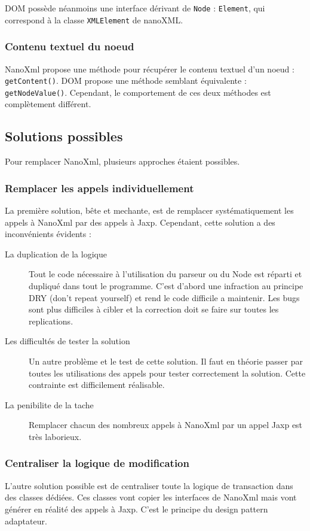 DOM possède néanmoins une interface dérivant de \verb|Node| : \verb|Element|, qui correspond à la classe \verb|XMLElement| de nanoXML.

\subsubsection{Contenu textuel du noeud}
NanoXml propose une méthode pour récupérer le contenu textuel d'un noeud : \verb|getContent()|.
DOM propose une méthode semblant équivalente : \verb|getNodeValue()|.
Cependant, le comportement de ces deux méthodes est complètement différent.


\subsection{Solutions possibles}
Pour remplacer NanoXml, plusieurs approches étaient possibles. 

\subsubsection{Remplacer les appels individuellement}
La première solution, bête et mechante, est de remplacer systématiquement les appels à NanoXml par des appels à Jaxp.
Cependant, cette solution a des inconvénients évidents :
\begin{description}
\item[La duplication de la logique] Tout le code nécessaire à l'utilisation du parseur ou du Node est réparti et dupliqué dans tout le programme.
C'est d'abord une infraction au principe DRY (don't repeat yourself) et rend le code difficile a maintenir.
Les bugs sont plus difficiles à cibler et la correction doit se faire sur toutes les replications.
\item[Les difficultés de tester la solution] Un autre problème et le test de cette solution.
Il faut en théorie passer par toutes les utilisations des appels pour tester correctement la solution. Cette contrainte est difficilement réalisable.
\item[La penibilite de la tache] Remplacer chacun des nombreux appels à NanoXml par un appel Jaxp est très laborieux.
\end{description}

\subsubsection{Centraliser la logique de modification}
L'autre solution possible est de centraliser toute la logique de transaction dans des classes dédiées. Ces classes vont copier les interfaces de NanoXml mais vont générer en réalité des appels à Jaxp. C'est le principe du design pattern adaptateur.

